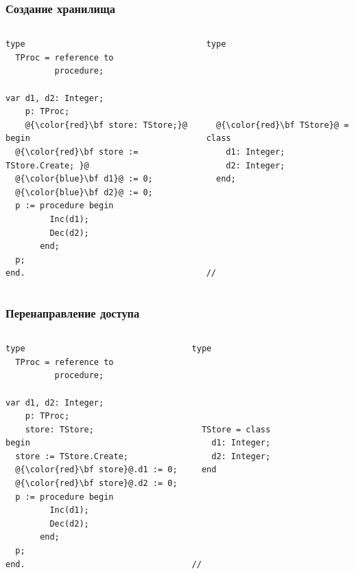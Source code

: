 \documentclass[roman,12pt]{beamer}
\begin{document}
\begin{frame}[fragile]
  \frametitle{Создание хранилища}
  \begin{columns}[c]
    \column{2.2in}
     \begin{lstlisting}[escapechar=@,basicstyle=\footnotesize]
type
  TProc = reference to
          procedure;

var d1, d2: Integer;
    p: TProc;
    @{\color{red}\bf store: TStore;}@
begin
  @{\color{red}\bf store := TStore.Create; }@
  @{\color{blue}\bf d1}@ := 0;
  @{\color{blue}\bf d2}@ := 0;
  p := procedure begin
         Inc(d1);
         Dec(d2);
       end;
  p;
end.
     \end{lstlisting}
   \column{2.2in}
     \begin{lstlisting}[escapechar=@,basicstyle=\footnotesize]  
type





  @{\color{red}\bf TStore}@ = class
    d1: Integer;
    d2: Integer;
  end;






//

     \end{lstlisting}

  \end{columns}
\end{frame}

\begin{frame}[fragile]
  \frametitle{Перенаправление доступа}
  \begin{columns}[c]
    \column{2.2in}
     \begin{lstlisting}[escapechar=@,basicstyle=\footnotesize]
type
  TProc = reference to
          procedure;

var d1, d2: Integer;
    p: TProc;
    store: TStore;
begin
  store := TStore.Create;
  @{\color{red}\bf store}@.d1 := 0;
  @{\color{red}\bf store}@.d2 := 0;
  p := procedure begin
         Inc(d1);
         Dec(d2);
       end;
  p;
end.
     \end{lstlisting}
   \column{2.2in}
     \begin{lstlisting}[escapechar=@,basicstyle=\footnotesize]  
type





  TStore = class
    d1: Integer;
    d2: Integer;
  end






//
     \end{lstlisting}

  \end{columns}
\end{frame}
\end{document}
